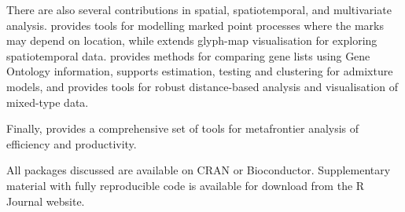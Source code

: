 There are also several contributions in spatial, spatiotemporal, and multivariate analysis.  provides tools for modelling marked point processes where the marks may depend on location, while  extends glyph-map visualisation for exploring spatiotemporal data.  provides methods for comparing gene lists using Gene Ontology information,  supports estimation, testing and clustering for admixture models, and  provides tools for robust distance-based analysis and visualisation of mixed-type data.

Finally,  provides a comprehensive set of tools for metafrontier analysis of efficiency and productivity.

All packages discussed are available on CRAN or Bioconductor. Supplementary material with fully reproducible code is available for download from the R Journal website.


\address{%
Emi Tanaka\\
Australian National University\\%
\\
%
\url{https://journal.r-project.org}\\%
%
\href{mailto:r-journal@r-project.org}{\nolinkurl{r-journal@r-project.org}}%
}
